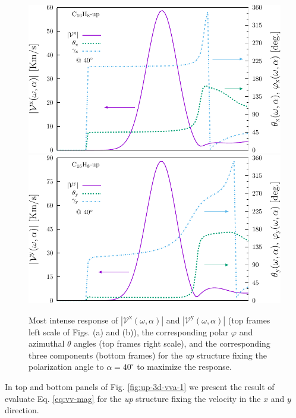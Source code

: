 \documentclass[prb,11pt,tightenlines,twocolumn,aps]{revtex4-1}
\begin{document}
\begin{figure}[t]
    \centering
    \includegraphics[width=\linewidth]{upplots/up-vxb-rtp-m1}
    \\ \vspace{4mm}
    \includegraphics[width=\linewidth]{upplots/up-vyb-rtp-m1}
    
    \caption{Most intense response of
    $|\mathcal{V}^{\mathrm{x}}(\omega,\alpha)|$ and
    $|\mathcal{V}^{\mathrm{y}}(\omega,\alpha)|$ (top frames left scale of Figs.
    (a) and (b)), the corresponding polar $\varphi$ and azimuthal $\theta$
    angles (top frames right scale), and the corresponding three components
    (bottom frames) for the \emph{up} structure fixing the polarization angle
    to $\alpha=40^{\circ}$ to maximize the response.}
    \label{fig:up-vab-comp-rtp-1}
\end{figure}
In top and bottom panels of Fig. \ref{fig:up-3d-vva-1} we present the
result of evaluate Eq. \eqref{eq:vv-mag} for the
\emph{up} structure fixing the velocity in the $x$ and $y$ direction.
\end{document}
